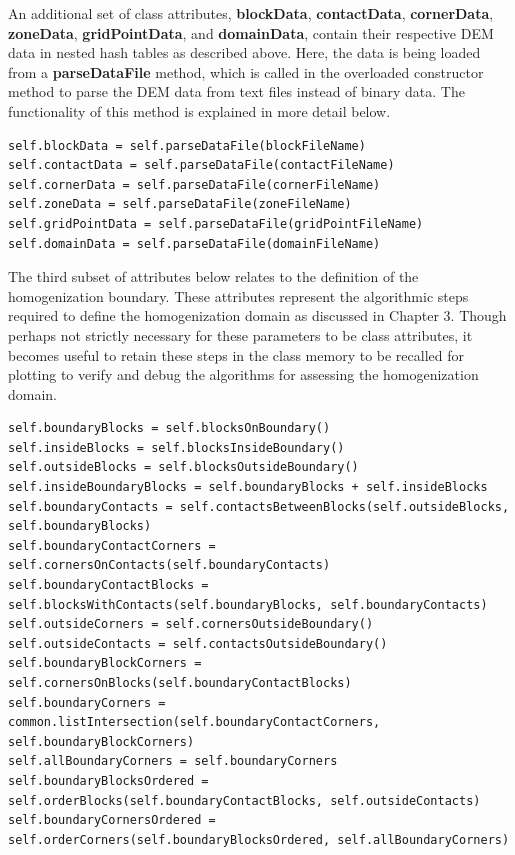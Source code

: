 An additional set of class attributes, \textbf{blockData}, \textbf{contactData}, \textbf{cornerData}, \textbf{zoneData}, \textbf{gridPointData}, and \textbf{domainData}, contain their respective DEM data in nested hash tables as described above. Here, the data is being loaded from a \textbf{parseDataFile} method, which is called in the overloaded constructor method to parse the DEM data from text files instead of binary data. The functionality of this method is explained in more detail below.

\begin{lstlisting}[frame=single] 
self.blockData = self.parseDataFile(blockFileName)
self.contactData = self.parseDataFile(contactFileName)
self.cornerData = self.parseDataFile(cornerFileName)
self.zoneData = self.parseDataFile(zoneFileName)
self.gridPointData = self.parseDataFile(gridPointFileName)
self.domainData = self.parseDataFile(domainFileName)
\end{lstlisting}

The third subset of attributes below relates to the definition of the homogenization boundary. These attributes represent the algorithmic steps required to define the homogenization domain as discussed in Chapter 3. Though perhaps not strictly necessary for these parameters to be class attributes, it becomes useful to retain these steps in the class memory to be recalled for plotting to verify and debug the algorithms for assessing the homogenization domain.

\begin{lstlisting}[frame=single] 
self.boundaryBlocks = self.blocksOnBoundary()
self.insideBlocks = self.blocksInsideBoundary()
self.outsideBlocks = self.blocksOutsideBoundary()
self.insideBoundaryBlocks = self.boundaryBlocks + self.insideBlocks
self.boundaryContacts = self.contactsBetweenBlocks(self.outsideBlocks, self.boundaryBlocks)
self.boundaryContactCorners = self.cornersOnContacts(self.boundaryContacts)
self.boundaryContactBlocks = self.blocksWithContacts(self.boundaryBlocks, self.boundaryContacts)
self.outsideCorners = self.cornersOutsideBoundary()
self.outsideContacts = self.contactsOutsideBoundary()
self.boundaryBlockCorners = self.cornersOnBlocks(self.boundaryContactBlocks)
self.boundaryCorners = common.listIntersection(self.boundaryContactCorners, self.boundaryBlockCorners)
self.allBoundaryCorners = self.boundaryCorners
self.boundaryBlocksOrdered = self.orderBlocks(self.boundaryContactBlocks, self.outsideContacts)
self.boundaryCornersOrdered = self.orderCorners(self.boundaryBlocksOrdered, self.allBoundaryCorners)
\end{lstlisting}


